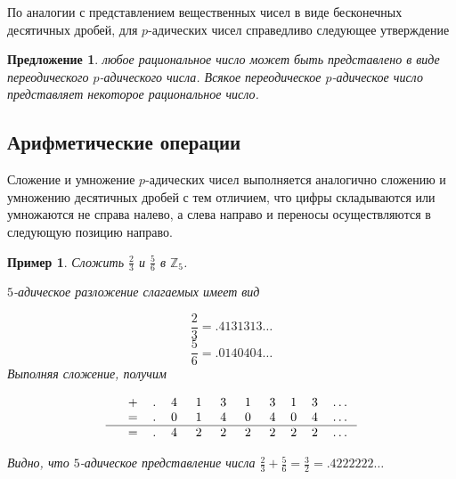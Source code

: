 \documentclass[master, och, diploma, times]{sty/SCWorks}
\theoremstyle{plain}
\newtheorem{proposition}{Предложение}[section]
\newtheorem{exmp}{Пример}[section]
\theoremstyle{definition}
\begin{document}
По аналогии с представлением вещественных чисел в виде бесконечных десятичных дробей, для $p$-адических чисел справедливо следующее утверждение

\begin{proposition}
любое рациональное число может быть представлено в виде переодического $p$-адического числа. Всякое переодическое $p$-адическое число представляет некоторое рациональное число.
\end{proposition}

\subsection{Арифметические операции}

Сложение и умножение $p$-адических чисел выполняется аналогично сложению и умножению десятичных дробей с тем отличием, что цифры складываются или умножаются не справа налево, а слева направо и переносы осуществляются в следующую позицию направо.

\begin{exmp}
Сложить $\frac{2}{3}$ и $\frac{5}{6}$ в $\mathbb{Z}_5$.

\noindent $5$-адическое разложение слагаемых имеет вид

$$
\frac{2}{3}=.4131313\dots
$$
$$
\frac{5}{6}=.0140404\dots
$$
Выполняя сложение, получим

$$
\begin{tabular}{cccccccccccc}
& + & . & 4\; & 1\; & 3\; & 1\; & 3 & 1 & 3 & \dots \\
& = & . & 0\; & 1\; & 4\; & 0\; & 4 & 0 & 4 & \dots \\
\hline
& = & . & 4\; & 2\; & 2\; & 2\; & 2 & 2 & 2 & \dots
\end{tabular}
$$

\noindent Видно, что $5$-адическое представление числа $\frac{2}{3} + \frac{5}{6}=\frac{3}{2}=.4222222\dots$
\end{exmp}
\end{document}

